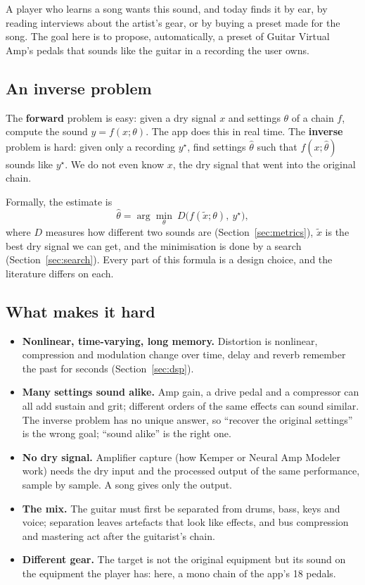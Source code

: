 A player who learns a song wants this sound, and today finds it by ear, by
reading interviews about the artist's gear, or by buying a preset made for the
song. The goal here is to propose, automatically, a preset of Guitar Virtual
Amp's pedals that sounds like the guitar in a recording the user owns.

\subsection{An inverse problem}

\begin{keyidea}
The \textbf{forward} problem is easy: given a dry signal $x$ and settings
$\theta$ of a chain $f$, compute the sound $y = f(x;\theta)$. The app does this
in real time. The \textbf{inverse} problem is hard: given only a recording
$y^\star$, find settings $\hat\theta$ such that $f(x;\hat\theta)$ sounds like
$y^\star$. We do not even know $x$, the dry signal that went into the original
chain.
\end{keyidea}

Formally, the estimate is
\[
  \hat\theta = \arg\min_{\theta}\ D\bigl(f(\tilde x;\theta),\ y^\star\bigr),
\]
where $D$ measures how different two sounds are (Section~\ref{sec:metrics}),
$\tilde x$ is the best dry signal we can get, and the minimisation is done by a
search (Section~\ref{sec:search}). Every part of this formula is a design
choice, and the literature differs on each.

\subsection{What makes it hard}

\begin{itemize}
\item \textbf{Nonlinear, time-varying, long memory.} Distortion is nonlinear,
  compression and modulation change over time, delay and reverb remember the
  past for seconds (Section~\ref{sec:dsp}).
\item \textbf{Many settings sound alike.} Amp gain, a drive pedal and a
  compressor can all add sustain and grit; different orders of the same
  effects can sound similar. The inverse problem has no unique answer, so
  ``recover the original settings'' is the wrong goal; ``sound alike'' is the
  right one.
\item \textbf{No dry signal.} Amplifier capture (how Kemper or Neural Amp
  Modeler work) needs the dry input and the processed output of the same
  performance, sample by sample. A song gives only the output.
\item \textbf{The mix.} The guitar must first be separated from drums, bass,
  keys and voice; separation leaves artefacts that look like effects, and
  bus compression and mastering act after the guitarist's chain.
\item \textbf{Different gear.} The target is not the original equipment but its
  sound on the equipment the player has: here, a mono chain of the app's 18
  pedals.
\end{itemize}

